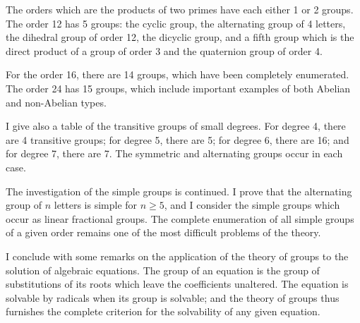 \documentclass[11pt,a4paper]{article}
\theoremstyle{plain}
\theoremstyle{definition}
\begin{document}
The orders which are the products of two primes have each either 1 or 2 groups. The order 12 has 5 groups: the cyclic group, the alternating group of 4 letters, the dihedral group of order 12, the dicyclic group, and a fifth group which is the direct product of a group of order 3 and the quaternion group of order 4.

For the order 16, there are 14 groups, which have been completely enumerated. The order 24 has 15 groups, which include important examples of both Abelian and non-Abelian types.

I give also a table of the transitive groups of small degrees. For degree 4, there are 4 transitive groups; for degree 5, there are 5; for degree 6, there are 16; and for degree 7, there are 7. The symmetric and alternating groups occur in each case.

The investigation of the simple groups is continued. I prove that the alternating group of $n$ letters is simple for $n \ge 5$, and I consider the simple groups which occur as linear fractional groups. The complete enumeration of all simple groups of a given order remains one of the most difficult problems of the theory.

I conclude with some remarks on the application of the theory of groups to the solution of algebraic equations. The group of an equation is the group of substitutions of its roots which leave the coefficients unaltered. The equation is solvable by radicals when its group is solvable; and the theory of groups thus furnishes the complete criterion for the solvability of any given equation.
\end{document}
